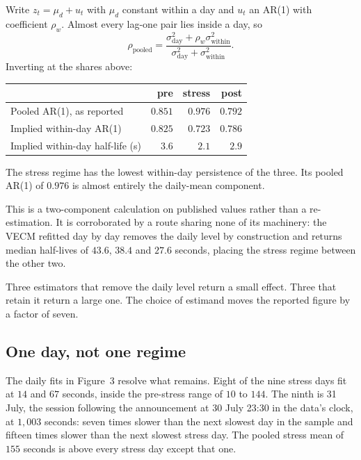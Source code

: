 \documentclass[11pt,a4paper]{article}
\begin{document}
Write $z_t = \mu_d + u_t$ with $\mu_d$ constant within a day and $u_t$ an AR(1) with
coefficient $\rho_w$. Almost every lag-one pair lies inside a day, so
\[
\rho_{\text{pooled}}
= \frac{\sigma_{\text{day}}^{2} + \rho_w \sigma_{\text{within}}^{2}}
       {\sigma_{\text{day}}^{2} + \sigma_{\text{within}}^{2}} .
\]
Inverting at the shares above:

\begin{center}
\small
\begin{tabular}{@{}lrrr@{}}
\toprule
 & pre & stress & post \\
\midrule
Pooled AR(1), as reported        & $0.851$ & $0.976$ & $0.792$ \\
Implied within-day AR(1)         & $0.825$ & $0.723$ & $0.786$ \\
Implied within-day half-life (s) & $3.6$ & $2.1$ & $2.9$ \\
\bottomrule
\end{tabular}
\end{center}

The stress regime has the lowest within-day persistence of the three. Its pooled AR(1) of
$0.976$ is almost entirely the daily-mean component.

This is a two-component calculation on published values rather than a re-estimation. It is
corroborated by a route sharing none of its machinery: the VECM refitted day by day removes
the daily level by construction and returns median half-lives of $43.6$, $38.4$ and $27.6$
seconds, placing the stress regime between the other two.

Three estimators that remove the daily level return a small effect. Three that retain it
return a large one. The choice of estimand moves the reported figure by a factor of seven.

\subsection{One day, not one regime}

The daily fits in Figure~3 resolve what remains. Eight of the nine stress days fit at
$14$ and $67$ seconds, inside the pre-stress range of $10$ to $144$. The ninth is 31 July,
the session following the announcement at 30 July 23:30 in the data's clock, at $1{,}003$
seconds: seven times slower than the next slowest day
in the sample and fifteen times slower than the next slowest stress day. The pooled stress
mean of $155$ seconds is above every stress day except that one.
\end{document}
